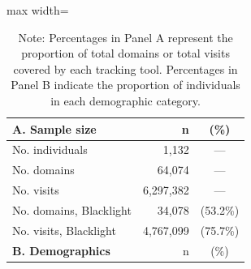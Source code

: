 \begin{table}[ht]
\captionsetup{justification=centering} %
\centering
\footnotesize
\setlength\tabcolsep{6 pt}
\setlength{\defaultaddspace}{0pt}
\def\sym#1{\ifmmode^{#1}\else\(^{#1}\)\fi}
\caption{Overview of data}
\label{tab:demo_summary}
\begin{adjustbox}{max width=\textwidth}
\begin{tabular}{@{\hspace{0\tabcolsep}}lrc@{\hspace{0\tabcolsep}}}
    \toprule\toprule
    \textbf{A. Sample size} & n & (\%)\\
    \midrule
    No. individuals & 1,132 & --- \\
    No. domains & 64,074 & ---\\
    No. visits & 6,297,382 & ---\\
    No. domains, Blacklight & 34,078 & (53.2\%) \\
    No. visits, Blacklight & 4,767,099 & (75.7\%) \\
    \midrule
    \textbf{B. Demographics} & n & (\%)\\
    \midrule
    
   \bottomrule
\end{tabular}
\end{adjustbox}
\caption*{\footnotesize Note:
    Percentages in Panel A represent the proportion of total domains or total visits covered by each tracking tool.
    Percentages in Panel B indicate the proportion of individuals in each demographic category.
}
\end{table}
